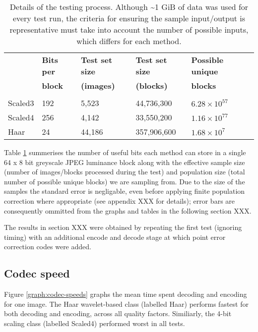 \begin{table}[tbp]
  \begin{center}
        \begin{tabular}{l l l l l}
        &\textbf{Bits per} &\textbf{Test set size} & \textbf{Test set size} &\textbf{Possible unique} \\ 
            &\textbf{block} &\textbf{(images)} &\textbf{(blocks)} &\textbf{blocks} \\ [0.1ex] \hline \\ [-1.5ex]
        Scaled3	&192	&5,523	&44,736,300	& $6.28 \times 10^{57}$ \\
        Scaled4	&256	&4,142	&33,550,200	& $1.16 \times 10^{77}$ \\
        Haar	&24	&44,186	&357,906,600	& $1.68 \times 10^{7}$ \\
        \end{tabular}
        \caption{Details of the testing process. Although \textasciitilde 1 GiB of data was used for every test run, the criteria for ensuring the sample input/output is representative must take into account the number of possible inputs, which differs for each method.}
        \label{tab:img-test}
    \end{center}
\end{table}


Table \ref{tab:img-test} summerises the number of useful bits each method can store in a single 64 x 8 bit greyscale JPEG luminance block along with the effective sample size (number of images/blocks processed during the test) and population size (total number of possible unique blocks) we are sampling from. Due to the size of the samples the standard error is negligable, even before applying finite population correction where appropriate (see appendix XXX for details); error bars are consequently ommitted from the graphs and tables in the following section XXX.

The results in section XXX were obtained by repeating the first test (ignoring timing) with an additional encode and decode stage at which point error correction codes were added.

\subsection{Codec speed}

Figure \ref{graph:codec-speeds} graphs the mean time spent decoding and encoding for one image. The Haar wavelet-based class (labelled Haar) performs fastest for both decoding and encoding, across all quality factors. Similiarly, the 4-bit scaling class (labelled Scaled4) performed worst in all tests. 

